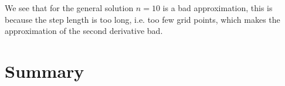 \documentclass[10pt]{article}
\begin{document}
We see that for the general solution $n=10$ is a bad approximation, this is because the step length is too long, i.e. too few grid points, which makes the approximation of the second derivative bad.

\section{Summary}

\printbibliography
\end{document}
